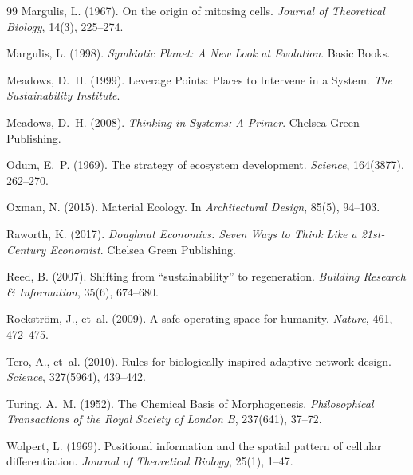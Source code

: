 \documentclass[11pt,a4paper]{article}
\begin{document}
\begin{thebibliography}{99}
Margulis, L. (1967).
\newblock On the origin of mitosing cells.
\newblock \emph{Journal of Theoretical Biology}, 14(3), 225--274.

Margulis, L. (1998).
\newblock \emph{Symbiotic Planet: A New Look at Evolution}.
\newblock Basic Books.

Meadows, D.~H. (1999).
\newblock Leverage Points: Places to Intervene in a System.
\newblock \emph{The Sustainability Institute}.

Meadows, D.~H. (2008).
\newblock \emph{Thinking in Systems: A Primer}.
\newblock Chelsea Green Publishing.

Odum, E.~P. (1969).
\newblock The strategy of ecosystem development.
\newblock \emph{Science}, 164(3877), 262--270.

Oxman, N. (2015).
\newblock Material Ecology.
\newblock In \emph{Architectural Design}, 85(5), 94--103.

Raworth, K. (2017).
\newblock \emph{Doughnut Economics: Seven Ways to Think Like a 21st-Century Economist}.
\newblock Chelsea Green Publishing.

Reed, B. (2007).
\newblock Shifting from ``sustainability'' to regeneration.
\newblock \emph{Building Research \& Information}, 35(6), 674--680.

Rockstr{\"o}m, J., et~al. (2009).
\newblock A safe operating space for humanity.
\newblock \emph{Nature}, 461, 472--475.

Tero, A., et~al. (2010).
\newblock Rules for biologically inspired adaptive network design.
\newblock \emph{Science}, 327(5964), 439--442.

Turing, A.~M. (1952).
\newblock The Chemical Basis of Morphogenesis.
\newblock \emph{Philosophical Transactions of the Royal Society of London B}, 237(641), 37--72.

Wolpert, L. (1969).
\newblock Positional information and the spatial pattern of cellular differentiation.
\newblock \emph{Journal of Theoretical Biology}, 25(1), 1--47.

\end{thebibliography}
\end{document}
